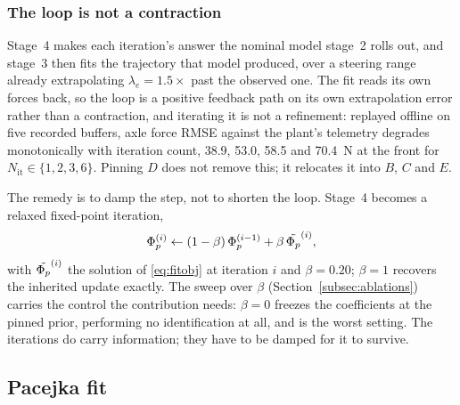 \subsubsection{The loop is not a contraction}
\label{subsec:relax}
Stage~4 makes each iteration's answer the nominal model stage~2 rolls out, and
stage~3 then fits the trajectory that model produced, over a steering range
already extrapolating $\lambda_{e}=1.5\times$ past the observed one. The fit
reads its own forces back, so the loop is a positive feedback path on its own
extrapolation error rather than a contraction, and iterating it is not a
refinement: replayed offline on five recorded buffers, axle force RMSE against
the plant's telemetry degrades monotonically with iteration count, \num{38.9},
\num{53.0}, \num{58.5} and \SI{70.4}{\newton} at the front for
$N_{\mathrm{it}}\in\{1,2,3,6\}$. Pinning $D$ does not remove this; it relocates
it into $B$, $C$ and $E$.

The remedy is to damp the step, not to shorten the loop. Stage~4 becomes a
relaxed fixed-point iteration,
\begin{equation}
\Phi_{p}^{(i)} \leftarrow (1-\beta)\,\Phi_{p}^{(i-1)} + \beta\,\tilde{\Phi_{p}}^{(i)},
\label{eq:relax}
\end{equation}
with $\tilde{\Phi_{p}}^{(i)}$ the solution of \eqref{eq:fitobj} at iteration $i$ and
$\beta=\num{0.20}$; $\beta=1$ recovers the inherited update exactly. The sweep
over $\beta$ (Section~\ref{subsec:ablations}) carries the control the
contribution needs: $\beta=0$ freezes the coefficients at the pinned prior,
performing no identification at all, and is the worst setting. The iterations
do carry information; they have to be damped for it to survive.

\subsection{Pacejka fit}
\label{subsec:fit}

